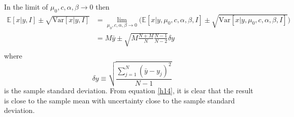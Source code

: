 \begin{example}
	In the limit of $\mu_0,c,\alpha,\beta\rightarrow 0$ then
	\begin{equation}
		\begin{split}
			\mathbb{E}[x|y,I]\pm \sqrt{\text{Var}[x|y,I]} &= \lim\limits_{\mu_0,c,\alpha,\beta\rightarrow 0}\big(\mathbb{E}[x|y,\mu_0,c,\alpha,\beta,I]\pm \sqrt{\text{Var}[x|y,\mu_0,c,\alpha,\beta,I]}\big)\\ 
			&= M\bar{y}\pm \sqrt{M\frac{N+M}{N}\frac{N-1}{N-2}}\delta y\\ 
		\end{split}
		\label{h14}
	\end{equation}
	where 
	\begin{equation}
		\delta y \equiv \sqrt{\frac{\sum_{j=1}^{N}(\bar{y}-y_j)^2}{N-1}}
	\end{equation}
	is the sample standard deviation. From equation \eqref{h14}, it is clear that the result is close to the sample mean with uncertainty close to the sample standard deviation.
	

\end{example}
